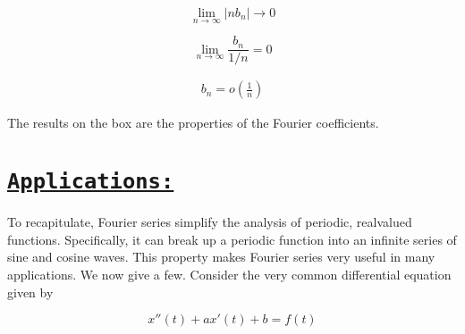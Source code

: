 \documentclass[a4paper,12pt]{article}
\begin{document}
        $$\lim_{n\to \infty}\left|nb_{n}\right|  \to 0$$

        $$\lim_{n\to \infty}\frac{b_{n}}{1/n}  = 0$$

        \begin{align*}
            \boxed{b_{n} = o\left(\frac{1}{n}\right)}
        \end{align*}

        The results on the box are the properties of the Fourier coefficients.

        \pagebreak

        \section*{\underline{\texttt{\textbf {Applications:}}}}

        To recapitulate, Fourier series simplify the analysis of periodic, real­valued functions. Specifically, it can break up a periodic function into an infinite series of
        sine and cosine waves. This property makes Fourier series very useful in many
        applications. We now give a few.
        Consider the very common differential equation given by

        $$x''(t) + ax'(t) + b = f(t)$$
\end{document}
